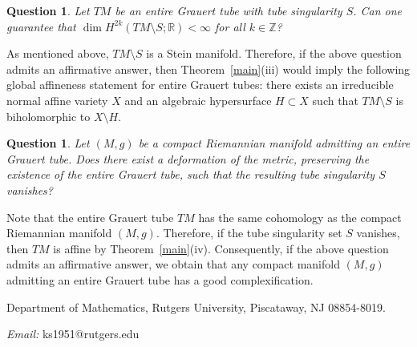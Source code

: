 \documentclass[a4paper, 12pt]{article}
\newcommand{\bZ}{\mathbb{Z}}
\newcommand{\bR}{\mathbb{R}}
\newtheorem{ques}[thm]{Question}
\begin{document}
\begin{ques}
Let $TM$ be an entire Grauert tube with tube singularity $S$. Can one guarantee that $\dim H^{2k}(TM \setminus S; \bR) < \infty$ for all $k \in \bZ$?
\end{ques}
As mentioned above, $TM\setminus S$ is a Stein manifold. Therefore, if the above question admits an affirmative answer, then Theorem~\ref{main}(iii) would imply the following global affineness statement for entire Grauert tubes: there exists an irreducible normal affine variety $X$ and an algebraic hypersurface $H \subset X$ such that $TM \setminus S$ is biholomorphic to $X \setminus H$.
\begin{ques}
Let $(M,g)$ be a compact Riemannian manifold admitting an entire Grauert tube. Does there exist a deformation of the metric, preserving the existence of the entire Grauert tube, such that the resulting tube singularity $S$ vanishes?
\end{ques}
Note that the entire Grauert tube $TM$ has the same cohomology as the compact Riemannian manifold $(M,g)$. Therefore, if the tube singularity set $S$ vanishes, then $TM$ is affine by Theorem~\ref{main}(iv). Consequently, if the above question admits an affirmative answer, we obtain that any compact manifold $(M,g)$ admitting an entire Grauert tube has a good complexification.



\vskip 3mm
\noindent
Department of Mathematics, Rutgers University, Piscataway, NJ 08854-8019.

\noindent
{\it Email:} ks1951@rutgers.edu
\end{document}
